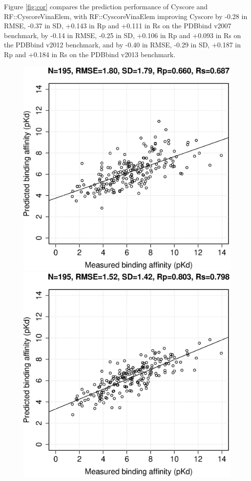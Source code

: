 \documentclass[journal=jacsat,manuscript=article]{achemso}
\begin{document}
Figure \ref{fig:cor} compares the prediction performance of Cyscore and RF::CyscoreVinaElem, with RF::CyscoreVinaElem improving Cyscore by -0.28 in RMSE, -0.37 in SD, +0.143 in Rp and +0.111 in Rs on the PDBbind v2007 benchmark, by -0.14 in RMSE, -0.25 in SD, +0.106 in Rp and +0.093 in Rs on the PDBbind v2012 benchmark, and by -0.40 in RMSE, -0.29 in SD, +0.187 in Rp and +0.184 in Rs on the PDBbind v2013 benchmark.

\begin{figure}[ht!]
\includegraphics[width=\linewidth]{../rfcyscore/x4/mlr/trn-247-tst-195-yp.eps}
\endminipage
{}
\includegraphics[width=\linewidth]{../rfcyscore/x46/rf/trn-1105-tst-195-yp.eps}

\end{figure}
\end{document}
